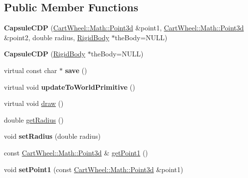 \subsection*{Public Member Functions}
\begin{DoxyCompactItemize}
\item 
\hypertarget{classCartWheel_1_1Physics_1_1CapsuleCDP_a13572ab81938b4a5dbc4a92ad2d5ea75}{
{\bfseries CapsuleCDP} (\hyperlink{classCartWheel_1_1Math_1_1Point3d}{CartWheel::Math::Point3d} \&point1, \hyperlink{classCartWheel_1_1Math_1_1Point3d}{CartWheel::Math::Point3d} \&point2, double radius, \hyperlink{classCartWheel_1_1Physics_1_1RigidBody}{RigidBody} $\ast$theBody=NULL)}
\label{classCartWheel_1_1Physics_1_1CapsuleCDP_a13572ab81938b4a5dbc4a92ad2d5ea75}

\item 
\hypertarget{classCartWheel_1_1Physics_1_1CapsuleCDP_a9055eff9b67d13d6e7d87a2fa917cf06}{
{\bfseries CapsuleCDP} (\hyperlink{classCartWheel_1_1Physics_1_1RigidBody}{RigidBody} $\ast$theBody=NULL)}
\label{classCartWheel_1_1Physics_1_1CapsuleCDP_a9055eff9b67d13d6e7d87a2fa917cf06}

\item 
\hypertarget{classCartWheel_1_1Physics_1_1CapsuleCDP_af93772cfbffd796cf0ddd3e0444aaf12}{
virtual const char $\ast$ {\bfseries save} ()}
\label{classCartWheel_1_1Physics_1_1CapsuleCDP_af93772cfbffd796cf0ddd3e0444aaf12}

\item 
\hypertarget{classCartWheel_1_1Physics_1_1CapsuleCDP_a20d291e2fa235beb6a5b9873fb447837}{
virtual void {\bfseries updateToWorldPrimitive} ()}
\label{classCartWheel_1_1Physics_1_1CapsuleCDP_a20d291e2fa235beb6a5b9873fb447837}

\item 
virtual void \hyperlink{classCartWheel_1_1Physics_1_1CapsuleCDP_a0b2d496f52bbe790ea08846e0f951d63}{draw} ()
\item 
double \hyperlink{classCartWheel_1_1Physics_1_1CapsuleCDP_a14c33956b26102cc523ce6098ade6fd8}{getRadius} ()
\item 
\hypertarget{classCartWheel_1_1Physics_1_1CapsuleCDP_a2386373a8e6453df75c5230104556206}{
void {\bfseries setRadius} (double radius)}
\label{classCartWheel_1_1Physics_1_1CapsuleCDP_a2386373a8e6453df75c5230104556206}

\item 
const \hyperlink{classCartWheel_1_1Math_1_1Point3d}{CartWheel::Math::Point3d} \& \hyperlink{classCartWheel_1_1Physics_1_1CapsuleCDP_a8601b16480a789f1c3e95635bb2bdc50}{getPoint1} ()
\item 
\hypertarget{classCartWheel_1_1Physics_1_1CapsuleCDP_a724d3ec9dc6e17a85f50a6c79149181c}{
void {\bfseries setPoint1} (const \hyperlink{classCartWheel_1_1Math_1_1Point3d}{CartWheel::Math::Point3d} \&point1)}
\label{classCartWheel_1_1Physics_1_1CapsuleCDP_a724d3ec9dc6e17a85f50a6c79149181c}


\end{DoxyCompactItemize}
